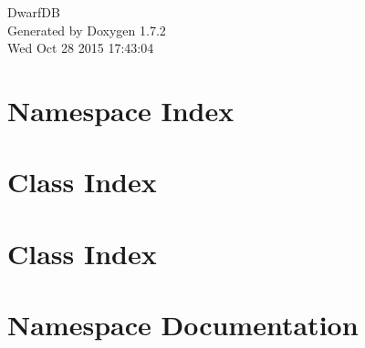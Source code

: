 \documentclass[a4paper]{book}
\begin{document}
\hypersetup{pageanchor=false}
\begin{titlepage}
\vspace*{7cm}
\begin{center}
{\Large DwarfDB }\\
\vspace*{1cm}
{\large Generated by Doxygen 1.7.2}\\
\vspace*{0.5cm}
{\small Wed Oct 28 2015 17:43:04}\\
\end{center}
\end{titlepage}
\clearemptydoublepage
{}
\tableofcontents
\clearemptydoublepage
{}
\hypersetup{pageanchor=true}
\chapter{Namespace Index}

\chapter{Class Index}

\chapter{Class Index}

\chapter{Namespace Documentation}













\end{document}
